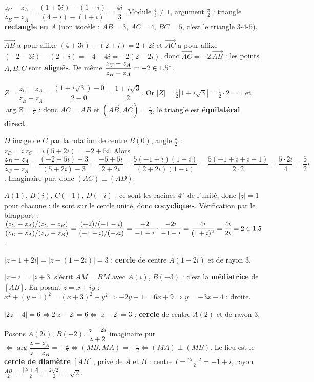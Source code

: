 $\dfrac{z_C-z_A}{z_B-z_A}=\dfrac{(1+5i)-(1+i)}{(4+i)-(1+i)}=\dfrac{4i}{3}$. Module $\frac43\neq1$,
argument $\frac\pi2$ : triangle \textbf{rectangle en $A$} (non isocèle : $AB=3$, $AC=4$, $BC=5$,
c'est le triangle $3$-$4$-$5$).

$\overrightarrow{AB}$ a pour affixe $(4+3i)-(2+i)=2+2i$ et $\overrightarrow{AC}$ a pour affixe
$(-2-3i)-(2+i)=-4-4i=-2(2+2i)$, donc $\overrightarrow{AC}=-2\,\overrightarrow{AB}$ : les points
$A,B,C$ sont \textbf{alignés}. De même $\dfrac{z_C-z_A}{z_B-z_A}=-2\in1.5^{*}$.

$Z=\dfrac{z_C-z_A}{z_B-z_A}=\dfrac{(1+i\sqrt3)-0}{2-0}=\dfrac{1+i\sqrt3}2$. Or
$|Z|=\frac12|1+i\sqrt3|=\frac12\cdot2=1$ et $\arg Z=\frac\pi3$ : donc $AC=AB$ et
$(\overrightarrow{AB},\overrightarrow{AC})=\frac\pi3$, le triangle est \textbf{équilatéral direct}.

$D$ image de $C$ par la rotation de centre $B(0)$, angle $\frac\pi2$ : $z_D=i\,z_C=i(5+2i)=-2+5i$.
Alors $\dfrac{z_D-z_A}{z_C-z_A}=\dfrac{(-2+5i)-3}{(5+2i)-3}=\dfrac{-5+5i}{2+2i}
=\dfrac{5(-1+i)(1-i)}{(2+2i)(1-i)}=\dfrac{5(-1+i+i+1)}{2\cdot2}=\dfrac{5\cdot2i}{4}=\dfrac{5}{2}i$.
Imaginaire pur, donc $(AC)\perp(AD)$.

$A(1)$, $B(i)$, $C(-1)$, $D(-i)$ : ce sont les racines $4^{\text e}$ de l'unité, donc $|z|=1$ pour
chacune : ils sont sur le cercle unité, donc \textbf{cocycliques}. Vérification par le birapport :
$\dfrac{(z_C-z_A)/(z_C-z_B)}{(z_D-z_A)/(z_D-z_B)}=\dfrac{(-2)/(-1-i)}{(-1-i)/(-2i)}
=\dfrac{-2}{-1-i}\cdot\dfrac{-2i}{-1-i}=\dfrac{4i}{(1+i)^2}=\dfrac{4i}{2i}=2\in1.5$.

$|z-1+2i|=|z-(1-2i)|=3$ : \textbf{cercle} de centre $A(1-2i)$ et de rayon $3$.

$|z-i|=|z+3|$ s'écrit $AM=BM$ avec $A(i)$, $B(-3)$ : c'est la \textbf{médiatrice} de $[AB]$.
En posant $z=x+iy$ : $x^2+(y-1)^2=(x+3)^2+y^2\Rightarrow -2y+1=6x+9\Rightarrow y=-3x-4$ : droite.

$|2z-4|=6\iff 2|z-2|=6\iff |z-2|=3$ : \textbf{cercle} de centre $A(2)$ et de rayon $3$.

Posons $A(2i)$, $B(-2)$. $\dfrac{z-2i}{z+2}$ imaginaire pur $\iff
\arg\dfrac{z-z_A}{z-z_B}=\pm\frac\pi2\iff(MB,MA)=\pm\frac\pi2\iff(MA)\perp(MB)$. Le lieu est le
\textbf{cercle de diamètre} $[AB]$, privé de $A$ et $B$ : centre $I=\frac{2i-2}2=-1+i$, rayon
$\frac{AB}2=\frac{|2i+2|}2=\frac{2\sqrt2}2=\sqrt2$.

